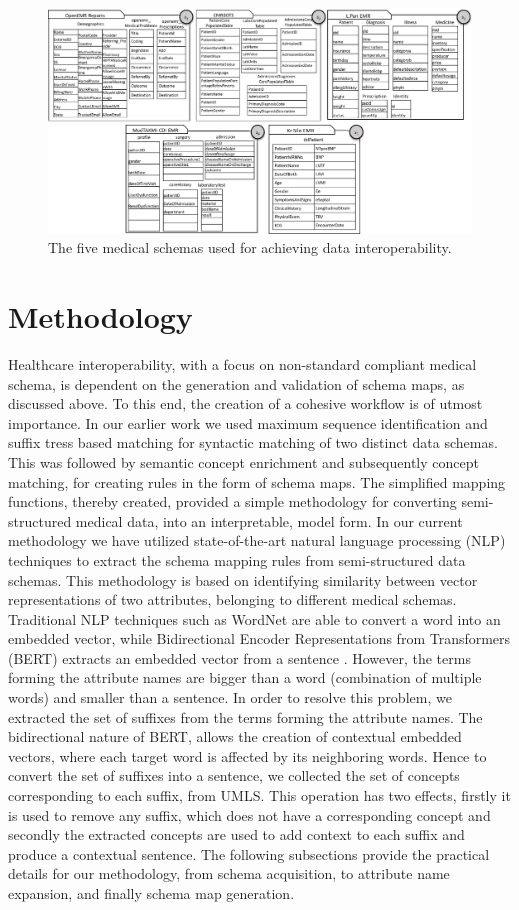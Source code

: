 \documentclass{ieeeaccess}
\begin{document}
\begin{figure}[t!]
	\centering
	\includegraphics[scale=0.53]{schemas}
	\caption{The five medical schemas used for achieving data interoperability.}
	\label{fig:schema}
\end{figure} 

\section{Methodology}
\label{methodology}
Healthcare interoperability, with a focus on non-standard compliant medical schema, is dependent on the generation and validation of schema maps, as discussed above. To this end, the creation of a cohesive workflow is of utmost importance. In our earlier work \cite{Satti2020} we used maximum sequence identification and suffix tress based matching for syntactic matching of two distinct data schemas. This was followed by semantic concept enrichment and subsequently concept matching, for creating rules in the form of schema maps. The simplified mapping functions, thereby created, provided a simple methodology for converting semi-structured medical data, into an interpretable, model form.
In our current methodology we have utilized state-of-the-art natural language processing (NLP) techniques to extract the schema mapping rules from semi-structured data schemas. This methodology is based on identifying similarity between vector representations of two attributes, belonging to different medical schemas. 
Traditional NLP techniques such as WordNet are able to convert a word into an embedded vector, while Bidirectional Encoder Representations from Transformers (BERT) extracts an embedded vector from a sentence \cite{zhu2018exploring}. However, the terms forming the attribute names are bigger than a word (combination of multiple words) and smaller than a sentence. In order to resolve this problem, we extracted the set of suffixes from the terms forming the attribute names. The bidirectional nature of BERT, allows the creation of contextual embedded vectors, where each target word is affected by its neighboring words. Hence to convert the set of suffixes into a sentence, we collected the set of concepts corresponding to each suffix, from UMLS. This operation has two effects, firstly it is used to remove any suffix, which does not have a corresponding concept and secondly the extracted concepts are used to add context to each suffix and produce a contextual sentence. 
The following subsections provide the practical details for our methodology, from schema acquisition, to attribute name expansion, and finally schema map generation.
\end{document}
